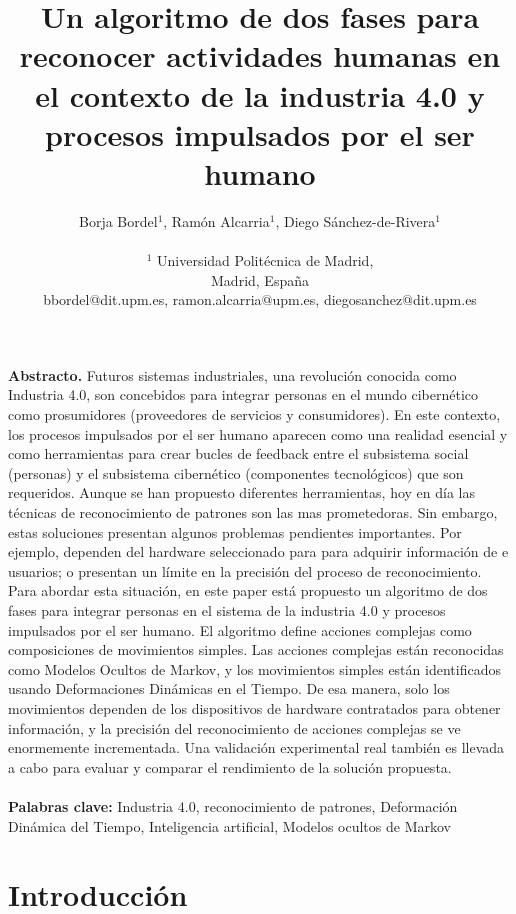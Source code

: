 \documentclass{article}
\title{\textbf{Un algoritmo de dos fases para reconocer actividades humanas en el contexto de la industria 4.0 y procesos impulsados por el ser humano}}
\author{Borja Bordel$^1$, Ramón Alcarria$^1$, Diego Sánchez-de-Rivera$^1$ \\
\\
$^1$ Universidad Politécnica de Madrid,\\
Madrid, España\\
bbordel@dit.upm.es, ramon.alcarria@upm.es, diegosanchez@dit.upm.es}
\date{}
\begin{document}
\pagestyle{empty}

\maketitle

\thispagestyle{empty}

\subsection*{}
\textbf{Abstracto.} Futuros sistemas industriales, una revolución conocida como Industria 4.0, son concebidos para integrar personas en el mundo cibernético como prosumidores (proveedores de servicios y consumidores). En este contexto, los procesos impulsados por el ser humano aparecen como una realidad esencial y como herramientas para crear bucles de feedback entre el subsistema social (personas) y el subsistema cibernético (componentes tecnológicos) que son requeridos. Aunque se han propuesto diferentes herramientas, hoy en día las técnicas de reconocimiento de patrones son las mas prometedoras. Sin embargo, estas soluciones presentan algunos problemas pendientes importantes. Por ejemplo, dependen del hardware seleccionado para para adquirir información de e usuarios; o presentan un límite en la precisión del proceso de reconocimiento. Para abordar esta situación, en este paper está propuesto un algoritmo de dos fases para integrar personas en el sistema de la industria 4.0 y procesos impulsados por el ser humano. El algoritmo define acciones complejas como composiciones de movimientos simples. Las acciones complejas están reconocidas como Modelos Ocultos de Markov, y los movimientos simples están identificados usando Deformaciones Dinámicas en el Tiempo. De esa manera, solo los movimientos dependen de los dispositivos de hardware contratados para obtener información, y la precisión del reconocimiento de acciones complejas se ve enormemente incrementada. Una validación experimental real también es llevada a cabo para evaluar y comparar el rendimiento de la solución propuesta. \\
\\
\textbf{Palabras clave:} Industria 4.0, reconocimiento de patrones, Deformación Dinámica del Tiempo, Inteligencia artificial, Modelos ocultos de Markov

\section{Introducción}
\end{document}
